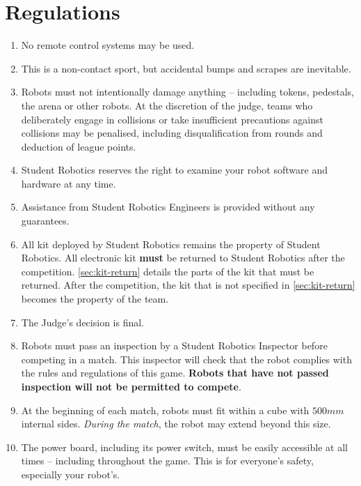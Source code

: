 \section {Regulations}
\label{sec:Regulations}

\begin{enumerate}


\item No remote control systems may be used.
\item This is a non-contact sport, but accidental bumps and scrapes are inevitable.
\item Robots must not intentionally damage anything -- including tokens, pedestals, the arena or other robots. At the discretion of the judge, teams who deliberately engage in collisions or take insufficient precautions against collisions may be penalised, including disqualification from rounds and deduction of league points.
\item Student Robotics reserves the right to examine your robot software and hardware at any time.
\item Assistance from Student Robotics Engineers is provided without any guarantees.
\item All kit deployed by Student Robotics remains the property of Student Robotics.
      All electronic kit \textbf{must} be returned to Student Robotics after the competition.
      \autoref{sec:kit-return} details the parts of the kit that must be returned.
      After the competition, the kit that is not specified in \autoref{sec:kit-return} becomes the property of the team.

\item The Judge's decision is final.


\item Robots must pass an inspection by a Student Robotics Inspector before competing in a match.
      This inspector will check that the robot complies with the rules and regulations of this game.
      \textbf{Robots that have not passed inspection will not be permitted to compete}.

\item At the beginning of each match, robots must fit within a cube with $500mm$ internal sides.
      \textit{During the match}, the robot may extend beyond this size.

\item The power board, including its power switch, must be easily accessible at all times -- including throughout the game.
      This is for everyone's safety, especially your robot's.


\end{enumerate}
